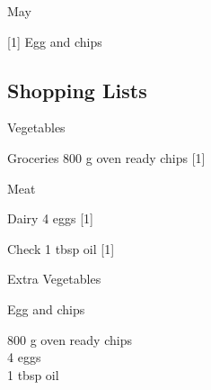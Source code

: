 		\begin{menu}{May}
    
    \begin{recipelist}
    
        {\scriptsize[1]} Egg and chips\\
    \end{recipelist}%
    \begin{recipelist}
    
    \end{recipelist}\par%
  
    \subsection*{Shopping Lists}
      \begin{shoppinglist}{Vegetables}
      \end{shoppinglist}%
      \begin{shoppinglist}{Groceries}
      800 g oven ready chips 
        {\scriptsize[1]}\\
      \end{shoppinglist}%
      \par\vfil %
      \begin{shoppinglist}{Meat}
      \end{shoppinglist}%
      \begin{shoppinglist}{Dairy}
      4  eggs 
        {\scriptsize[1]}\\
      \end{shoppinglist}%
      \par\vfil %
      \vfil\clearpage %
      \begin{shoppinglist}{Check}
      1 tbsp oil 
        {\scriptsize[1]}\\
      \end{shoppinglist}%
      \begin{shoppinglist}{Extra Vegetables}
      \end{shoppinglist}%
      \par\vfil %
    \vfil\clearpage
  
    \begin{recipe}{1}{Egg and chips}%
    
		\begin{ingredients}
		800 g oven ready chips  \\
	4  eggs  \\
	1 tbsp oil  \\
	

\end{ingredients}
\end{recipe}
\end{menu}
